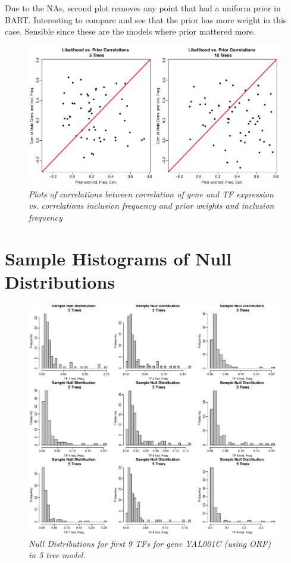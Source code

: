\documentclass[12pt]{article}
\begin{document}
Due to the NAs, second plot removes any point that had a uniform prior in BART. Interesting to compare and see that the prior has more weight in this case. Sensible since these are the models where prior mattered more. 
\begin{figure}[H]
\centerline{\includegraphics[scale=.6]{shaneWeights.pdf}}
\caption{\it Plots of correlations between correlation of gene and TF expression vs. correlations inclusion frequency and prior weights and inclusion frequency}
\label{fig:version2}  
\end{figure}



\section{Sample Histograms of Null Distributions}

\begin{figure}[H]
\centerline{\includegraphics[scale=.70]{null5.pdf}}
\caption{\it Null Distributions for first 9 TFs for gene YAL001C (using ORF) in 5 tree model.}
\label{fig:version2}  
\end{figure}
\end{document}
